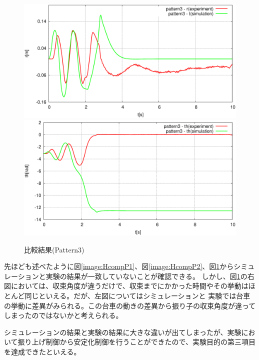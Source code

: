 	\begin{figure}[H]
		\centering
		\includegraphics[width=0.49\linewidth]{gazo/HcompP3R.eps}
		\includegraphics[width=0.49\linewidth]{gazo/HcompP3TH.eps}
		\caption{比較結果(Pattern3)}
		\label{image:HcompP3}
	\end{figure}
	
	\par
	先ほども述べたように図\ref{image:HcompP1}、図\ref{image:HcompP2}、図\ref{image:HcompP3}からシミュレーションと実験の結果が一致していないことが確認できる。
	しかし、図\ref{image:HcompP3}の右図においては、収束角度が違うだけで、収束までにかかった時間やその挙動はほとんど同じといえる。だが、左図についてはシミュレーションと
	実験では台車の挙動に差異がみられる。この台車の動きの差異から振り子の収束角度が違ってしまったのではないかと考えられる。
	\par
	シミュレーションの結果と実験の結果に大きな違いが出てしまったが、実験において振り上げ制御から安定化制御を行うことができたので、実験目的の第三項目を達成できたといえる。
	
